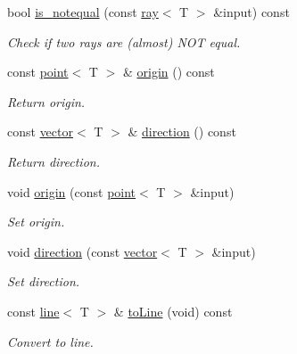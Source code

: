 \begin{DoxyCompactItemize}
bool \hyperlink{classddd_1_1ray_a905bb4921312cd23ee918d90a1e7f6e8}{is\+\_\+notequal} (const \hyperlink{classddd_1_1ray}{ray}$<$ T $>$ \&input) const
\begin{DoxyCompactList}\small\item\em Check if two rays are (almost) N\+OT equal. \end{DoxyCompactList}\item 
\mbox{\label{classddd_1_1ray_a92ad567ccc11d6d2bb9faa66cefbb9ca}} 
const \hyperlink{classddd_1_1point}{point}$<$ T $>$ \& \hyperlink{classddd_1_1ray_a92ad567ccc11d6d2bb9faa66cefbb9ca}{origin} () const
\begin{DoxyCompactList}\small\item\em Return origin. \end{DoxyCompactList}\item 
\mbox{\label{classddd_1_1ray_a8c6a38d8e1fcda4a44791ad17c99866e}} 
const \hyperlink{classddd_1_1vector}{vector}$<$ T $>$ \& \hyperlink{classddd_1_1ray_a8c6a38d8e1fcda4a44791ad17c99866e}{direction} () const
\begin{DoxyCompactList}\small\item\em Return direction. \end{DoxyCompactList}\item 
void \hyperlink{classddd_1_1ray_ac7a05d23b571b8e60ab9b25e53a8962f}{origin} (const \hyperlink{classddd_1_1point}{point}$<$ T $>$ \&input)
\begin{DoxyCompactList}\small\item\em Set origin. \end{DoxyCompactList}\item 
void \hyperlink{classddd_1_1ray_a52a945e00576b41d9e42a221a26aee14}{direction} (const \hyperlink{classddd_1_1vector}{vector}$<$ T $>$ \&input)
\begin{DoxyCompactList}\small\item\em Set direction. \end{DoxyCompactList}\item 
\mbox{\label{classddd_1_1ray_a407808f80ae5b3ac9d3ef7f35ff4d671}} 
const \hyperlink{classddd_1_1line}{line}$<$ T $>$ \& \hyperlink{classddd_1_1ray_a407808f80ae5b3ac9d3ef7f35ff4d671}{to\+Line} (void) const
\begin{DoxyCompactList}\small\item\em Convert to line. \end{DoxyCompactList}\item 

\end{DoxyCompactItemize}
